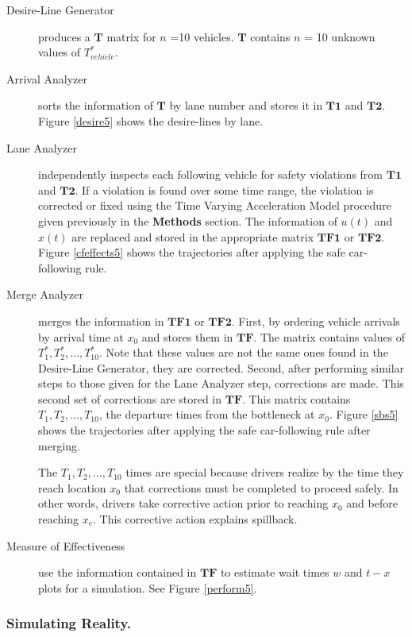 \documentclass[Proceedings]{ascelike}
\begin{document}
\begin{description}
\item [ Desire-Line Generator] produces a $\mathbf{T}$ matrix for $n$ =10 vehicles. $\mathbf{T}$ contains $n$ = 10     unknown values of $T_{vehicle}^*$.  
\item [ Arrival Analyzer] sorts the information of $\mathbf{T}$ by lane number and stores it in $\mathbf{T1}$ and  $\mathbf{T2}$. Figure \ref{desire5} shows the desire-lines by lane.
\item [ Lane Analyzer] independently inspects each following vehicle for safety violations from $\mathbf{T1}$ and  $\mathbf{T2}$. If a violation is found over some time range, the violation is corrected or fixed using the Time Varying Acceleration Model procedure given previously in the \textbf{Methods} section.  The information of $u(t)$ and $x(t)$  are replaced and stored in   the appropriate matrix $\mathbf{TF1}$ or  $\mathbf{TF2}$. Figure \ref{cfeffects5} shows the trajectories after applying the safe car-following rule.
\item [ Merge Analyzer] merges the information in $\mathbf{TF1}$ or  $\mathbf{TF2}$. First, by ordering vehicle arrivals by arrival time at $x_0$ and stores them in $\mathbf{TF}$. The matrix contains values of  $T^*_1, T^*_2,\ldots,T^*_{10}$. Note that these values are  not the same ones found in the Desire-Line Generator, they are corrected. Second, after performing similar steps to those given for the  Lane Analyzer step, corrections are made. This second set of corrections are stored in $\mathbf{TF}$. This matrix contains $T_1, T_2,\ldots,T_{10}$, the departure times from the bottleneck at $x_0$.  Figure \ref{sbs5} shows the trajectories after applying the safe car-following rule after merging.

The $T_1, T_2,\ldots,T_{10}$ times are special because drivers realize by the time they reach location $x_0$ that corrections must be completed to proceed safely. In other words, drivers take corrective action prior to reaching $x_0$ and before reaching $x_e$. This corrective action explains spillback.

\item [ Measure of Effectiveness] use the information contained in $\mathbf{TF}$ to estimate wait times $w$ and $t-x$ plots for a simulation. See Figure \ref{perform5}.
\end{description}

\subsubsection{Simulating Reality.} 
\end{document}
